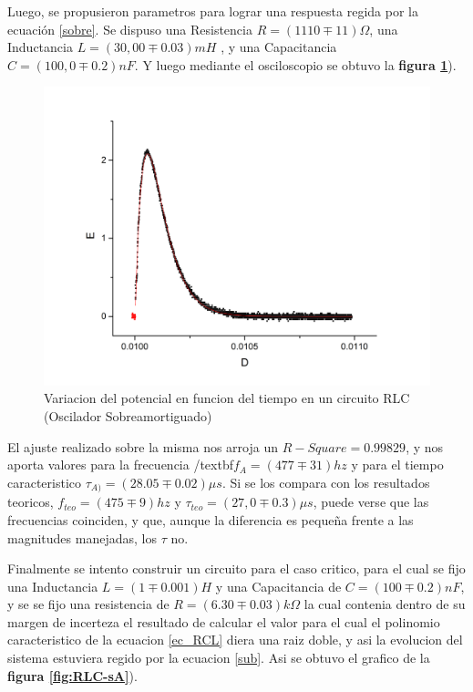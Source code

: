 \documentclass[11pt,a4paper]{article}
\begin{document}
Luego, se propusieron parametros para lograr una respuesta regida por la ecuación \eqref{sobre}. Se dispuso una Resistencia $R= (1110 \mp 11)\Omega$, una Inductancia $L = (30,00 \mp 0.03) mH$ , y una Capacitancia $C = (100,0 \mp 0.2) nF$. Y luego mediante el osciloscopio se obtuvo la \textbf{figura \ref{fig:RLC-SA}}).

\begin{figure}[H]
\centering
\includegraphics[scale=0.45]{RLC-SobreAmortiguado}
  \caption{Variacion del potencial en funcion del tiempo en un circuito RLC (Oscilador Sobreamortiguado)}
  \label{fig:RLC-SA}
\end{figure}

El ajuste realizado sobre la misma nos arroja un $R-Square = 0.99829$, y nos aporta valores para la frecuencia /textbf{$f_{A} = (477 \mp 31) hz$} y para el tiempo caracteristico \textbf{$\tau_{A)} = (28.05 \mp 0.02) \mu s$}. Si se los compara con los resultados teoricos, \textbf{$f_{teo} = (475 \mp 9) hz$} y \textbf{$\tau_{teo} = (27,0 \mp 0.3) \mu s$}, puede verse que las frecuencias coinciden, y que, aunque la diferencia es pequeña frente a las magnitudes manejadas, los $\tau$ no.

Finalmente se intento construir un circuito para el caso critico, para el cual se fijo una Inductancia $L= (1 \mp 0.001) H$ y una Capacitancia de  $C = (100 \mp 0.2) nF$, y se se fijo una resistencia de $R = (6.30 \mp 0.03) k\Omega$ la cual contenia dentro de su margen de incerteza el resultado de calcular el valor para el cual el polinomio caracteristico de la ecuacion \eqref{ec_RCL} diera una raiz doble, y asi la evolucion del sistema estuviera regido por la ecuacion \eqref{sub}. Asi se obtuvo el grafico de la \textbf{figura \ref{fig:RLC-sA}}).
\end{document}
